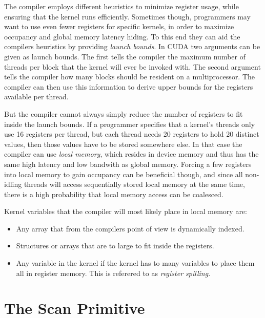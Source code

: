 
The compiler employs different heuristics to minimize register usage, while
ensuring that the kernel runs efficiently. Sometimes though, programmers may
want to use even fewer registers for specific kernels, in order to maximize
occupancy and global memory latency hiding. To this end they can aid the
compilers heuristics by providing \textit{launch bounds}. In CUDA two arguments
can be given as launch bounds. The first tells the compiler the maximum number
of threads per block that the kernel will ever be invoked with. The second
argument tells the compiler how many blocks should be resident on a
multiprocessor. The compiler can then use this information to derive upper
bounds for the registers available per thread.





But the compiler cannot always simply reduce the number of registers to fit
inside the launch bounds. If a programmer specifies that a kernel's threads only
use 16 registers per thread, but each thread needs 20 registers to hold 20
distinct values, then those values have to be stored somewhere else. In that
case the compiler can use \textit{local memory}, which resides in device memory
and thus has the same high latency and low bandwith as global memory. Forcing a
few registers into local memory to gain occupancy can be beneficial though, and
since all non-idling threads will access sequentially stored local memory at the
same time, there is a high probability that local memory access can be
coalesced.

Kernel variables that the compiler will most likely place in local
memory are:

\begin{itemize}
  \item Any array that from the compilers point of view is dynamically
    indexed.
  \item Structures or arrays that are to large to fit inside the
    registers.
  \item Any variable in the kernel if the kernel has to many variables
    to place them all in register memory. This is referered to as
    \textit{register spilling}.
\end{itemize}



\section{The Scan Primitive}\label{sec:GPUprims}

